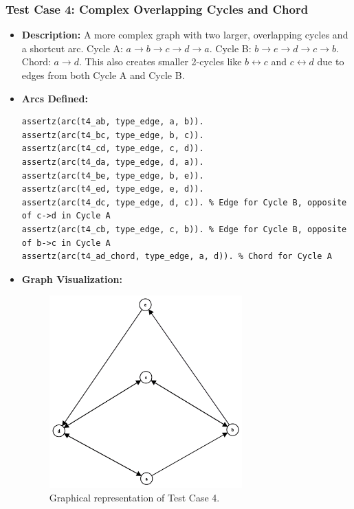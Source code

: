 \documentclass[12pt,a4paper]{article}
\begin{document}
\subsubsection{Test Case 4: Complex Overlapping Cycles and Chord}
\begin{itemize}
\item \textbf{Description:} A more complex graph with two larger, overlapping cycles and a shortcut arc.
Cycle A: $a \rightarrow b \rightarrow c \rightarrow d \rightarrow a$. 
Cycle B: $b \rightarrow e \rightarrow d \rightarrow c \rightarrow b$. 
Chord: $a \rightarrow d$. 
This also creates smaller 2-cycles like $b \leftrightarrow c$ and $c \leftrightarrow d$ due to edges from both Cycle A and Cycle B. 
\item \textbf{Arcs Defined:}
\begin{lstlisting}[style=prologstyle, basicstyle=\ttfamily\footnotesize]
assertz(arc(t4_ab, type_edge, a, b)).
assertz(arc(t4_bc, type_edge, b, c)).
assertz(arc(t4_cd, type_edge, c, d)).
assertz(arc(t4_da, type_edge, d, a)).
assertz(arc(t4_be, type_edge, b, e)).
assertz(arc(t4_ed, type_edge, e, d)).
assertz(arc(t4_dc, type_edge, d, c)). % Edge for Cycle B, opposite of c->d in Cycle A
assertz(arc(t4_cb, type_edge, c, b)). % Edge for Cycle B, opposite of b->c in Cycle A
assertz(arc(t4_ad_chord, type_edge, a, d)). % Chord for Cycle A
\end{lstlisting}
\item \textbf{Graph Visualization:}
\begin{figure}[H]
\centering
\includegraphics[width=0.7\textwidth]{img/Test4.png} %
\caption{Graphical representation of Test Case 4.}
\label{fig:testcase4}

\end{figure}
\end{itemize}
\end{document}
